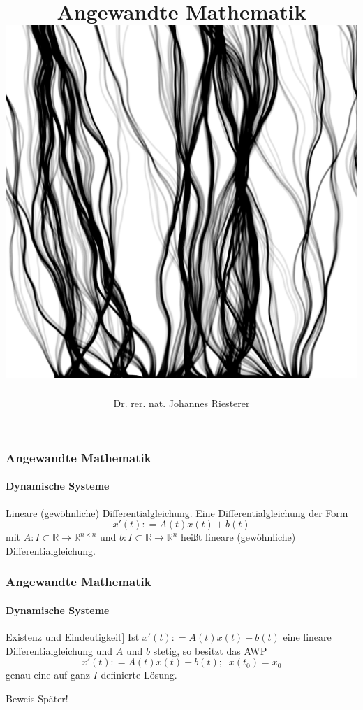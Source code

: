 \documentclass{beamer}
\begin{document}
\title[Angewandte Mathematik] %
{Angewandte Mathematik
\\
\includegraphics[scale=0.15]{images/cover}
}
\subtitle{}
\author[Dr. Johannes Riesterer] %
{Dr.  rer. nat. Johannes Riesterer}

\date[KPT 2004] %
{}

\subject{Angewandte Mathematik}



\frame{\titlepage}



\begin{frame}
    \frametitle{Angewandte Mathematik}
\framesubtitle{Dynamische Systeme }
\begin{block}{Lineare (gewöhnliche) Differentialgleichung.}
Eine Differentialgleichung der Form
$$ x' (t): = A(t) x(t) + b(t)$$
mit $A: I \subset \mathbb{R} \to \mathbb{R}^{n \times n}$ und $b: I \subset \mathbb{R} \to \mathbb{R}^{n}$ heißt lineare (gewöhnliche) Differentialgleichung.
\end{block}

 \end{frame}


\begin{frame}
    \frametitle{Angewandte Mathematik}
\framesubtitle{Dynamische Systeme }
\begin{block}{Existenz und Eindeutigkeit]}
Ist $x' (t): = A(t) x(t) + b(t)$ eine lineare Differentialgleichung und $A$ und $b$ stetig, so besitzt das AWP 
$$ x' (t): = A(t) x(t) + b(t) ; \; \; x(t_0) = x_0 $$
genau eine auf ganz $I$ definierte Lösung.
\end{block}
\begin{block}{Beweis}
    Später!
\end{block}
 \end{frame}
\end{document}
